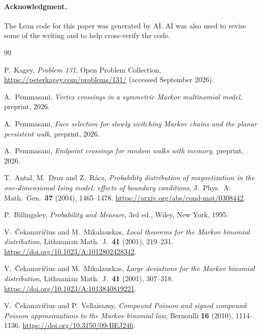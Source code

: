 \documentclass[11pt]{article}
\theoremstyle{definition}
\theoremstyle{remark}
\begin{document}
\paragraph{Acknowledgment.}
The Lean code for this paper was generated by AI. AI was also used to revise
some of the writing and to help cross-verify the code.

\appendix




\begin{thebibliography}{99}\small\setlength{\baselineskip}{11pt}\setlength{\itemsep}{0pt}\setlength{\parsep}{0pt}

P.~Kagey, \emph{Problem 131}, Open Problem Collection,
\url{https://peterkagey.com/problems/131/} (accessed September 2026).

A.~Pemmasani, \emph{Vertex crossings in a symmetric Markov multinomial
model}, preprint, 2026.

A.~Pemmasani, \emph{Face selection for slowly switching Markov chains and
the planar persistent walk}, preprint, 2026.

A.~Pemmasani, \emph{Endpoint crossings for random walks with memory},
preprint, 2026.

T.~Antal, M.~Droz and Z.~R\'acz, \emph{Probability distribution of magnetization in the
one-dimensional Ising model: effects of boundary conditions},
J.~Phys.~A: Math.~Gen.~\textbf{37} (2004), 1465--1478.
\url{https://arxiv.org/abs/cond-mat/0308442}.

P.~Billingsley, \emph{Probability and Measure}, 3rd ed., Wiley, New York, 1995.

V.~\v{C}ekanavi\v{c}ius and M.~Mikalauskas,
\emph{Local theorems for the Markov binomial distribution},
Lithuanian Math.~J.~\textbf{41} (2001), 219--231.
\url{https://doi.org/10.1023/A:1012802428342}.

V.~\v{C}ekanavi\v{c}ius and M.~Mikalauskas,
\emph{Large deviations for the Markov binomial distribution},
Lithuanian Math.~J.~\textbf{41} (2001), 307--318.
\url{https://doi.org/10.1023/A:1013840819221}.

V.~\v{C}ekanavi\v{c}ius and P.~Vellaisamy, \emph{Compound Poisson and signed
compound Poisson approximations to the Markov binomial law}, Bernoulli
\textbf{16} (2010), 1114--1136. \url{https://doi.org/10.3150/09-BEJ246}.


\end{thebibliography}
\end{document}
